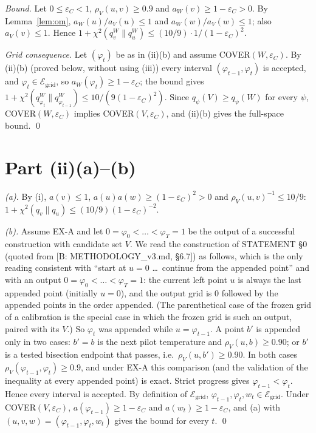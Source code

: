 \documentclass[11pt]{article}
\theoremstyle{remark}
\newcommand{\E}{\mathcal{E}_{\mathrm{grid}}}
\newcommand{\chisq}{\chi^2}
\begin{document}
\emph{Bound.} Let $0\le\varepsilon_C<1$, $\rho_V(u,v)\ge 0.9$ and $a_W(v)\ge1-\varepsilon_C>0$. By Lemma~\ref{lem:om}, $a_W(u)/a_V(u)\le1$ and $a_W(w)/a_V(w)\le1$; also $a_V(v)\le1$. Hence
$1+\chisq(q_v^W\|q_u^W)\le (10/9)\cdot 1/(1-\varepsilon_C)^2$.

\emph{Grid consequence.} Let $(\varphi_t)$ be as in (ii)(b) and assume COVER$(W,\varepsilon_C)$. By (ii)(b) (proved below, without using (iii)) every interval $(\varphi_{t-1},\varphi_t)$ is accepted, and $\varphi_t\in\E$, so $a_W(\varphi_t)\ge1-\varepsilon_C$; the bound gives $1+\chisq(q^W_{\varphi_t}\|q^W_{\varphi_{t-1}})\le 10/(9(1-\varepsilon_C)^2)$. Since $q_\psi(V)\ge q_\psi(W)$ for every $\psi$, COVER$(W,\varepsilon_C)$ implies COVER$(V,\varepsilon_C)$, and (ii)(b) gives the full-space bound. \qed

\section{Part (ii)(a)--(b)}
\emph{(a).} By (i), $a(v)\le1$, $a(u)a(w)\ge(1-\varepsilon_C)^2>0$ and $\rho_V(u,v)^{-1}\le 10/9$:
$1+\chisq(q_v\|q_u)\le (10/9)(1-\varepsilon_C)^{-2}$.

\emph{(b).} Assume EX-A and let $0=\varphi_0<\dots<\varphi_T=1$ be the output of a successful construction with candidate set $V$. We read the construction of STATEMENT \S0 (quoted from [B: METHODOLOGY\_v3.md, \S6.7]) as follows, which is the only reading consistent with ``start at $u=0$ \dots\ continue from the appended point'' and with an output $0=\varphi_0<\dots<\varphi_T=1$: the current left point $u$ is always the last appended point (initially $u=0$), and the output grid is $0$ followed by the appended points in the order appended. (The parenthetical case of the frozen grid of a calibration is the special case in which the frozen grid is such an output, paired with its $V$.) So $\varphi_t$ was appended while $u=\varphi_{t-1}$. A point $b'$ is appended only in two cases: $b'=b$ is the next pilot temperature and $\rho_V(u,b)\ge0.90$; or $b'$ is a tested bisection endpoint that passes, i.e.\ $\rho_V(u,b')\ge0.90$. In both cases $\rho_V(\varphi_{t-1},\varphi_t)\ge 0.9$, and under EX-A this comparison (and the validation of the inequality at every appended point) is exact. Strict progress gives $\varphi_{t-1}<\varphi_t$. Hence every interval is accepted. By definition of $\E$, $\varphi_{t-1},\varphi_t,w_t\in\E$. Under COVER$(V,\varepsilon_C)$, $a(\varphi_{t-1})\ge1-\varepsilon_C$ and $a(w_t)\ge1-\varepsilon_C$, and (a) with $(u,v,w)=(\varphi_{t-1},\varphi_t,w_t)$ gives the bound for every $t$. \qed
\end{document}
